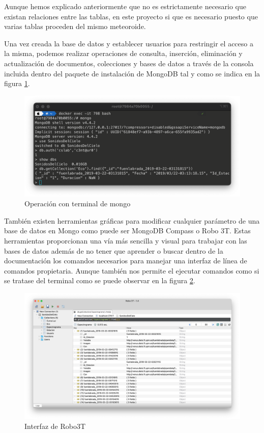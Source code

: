 Aunque hemos explicado anteriormente que no es estrictamente necesario que existan relaciones entre las tablas, en este proyecto si que es necesario puesto que varias tablas proceden del mismo meteoroide.

Una vez creada la base de datos y establecer usuarios para restringir el acceso a la misma, podemos realizar operaciones de consulta, inserción, eliminación y actualización de documentos, colecciones y bases de datos a través de la consola incluida dentro del paquete de instalación de MongoDB tal y como se indica en la figura \ref{fig:terminal_mongo}. 

\begin{figure}[H]
    \centering
    \includegraphics[scale=0.4]{include/capturas/TerminalMongo.png}
    \caption{Operación con terminal de mongo}
    \label{fig:terminal_mongo}
\end{figure}

También existen herramientas gráficas para modificar cualquier parámetro de una base de datos en Mongo como puede ser MongoDB Compass o Robo 3T. Estas herramientas proporcionan una vía más sencilla y visual para trabajar con las bases de datos además de no tener que aprender o buscar dentro de la documentación los comandos necesarios para manejar una interfaz de línea de comandos propietaria. Aunque también nos permite el ejecutar comandos como si se tratase del terminal como se puede observar en la figura \ref{fig:robo3t}.

\begin{figure}[H]
    \centering
    \includegraphics[scale=0.3]{include/capturas/Robo3T.png}
    \caption{Interfaz de Robo3T}
    \label{fig:robo3t}
\end{figure}

